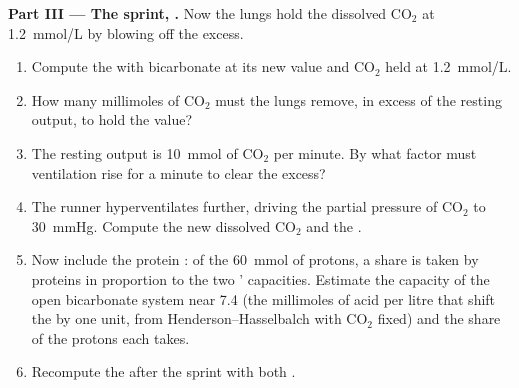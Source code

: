 \begin{problem}
\medskip
\noindent\textbf{Part III --- The sprint, .}
Now the lungs hold the dissolved $\mathrm{CO_2}$ at \qty{1.2}{mmol/L}
by blowing off the excess.
\begin{enumerate}[resume]
  \item Compute the  with bicarbonate at its new value and
        $\mathrm{CO_2}$ held at \qty{1.2}{mmol/L}.
  \item How many millimoles of $\mathrm{CO_2}$ must the lungs remove,
        in excess of the resting output, to hold the value?
  \item The resting output is \qty{10}{mmol} of $\mathrm{CO_2}$ per
        minute. By what factor must ventilation rise for a minute to
        clear the excess?
  \item The runner hyperventilates further, driving the partial
        pressure of $\mathrm{CO_2}$ to \qty{30}{mmHg}. Compute the new
        dissolved $\mathrm{CO_2}$ and the .
  \item Now include the protein : of the \qty{60}{mmol} of
        protons, a share is taken by proteins in proportion to the two
        ' capacities. Estimate the capacity of the open
        bicarbonate system near  7.4 (the millimoles of acid per
        litre that shift the  by one unit, from Henderson--Hasselbalch
        with $\mathrm{CO_2}$ fixed) and the share of the protons each
         takes.
  \item Recompute the  after the sprint with both .
\end{enumerate}


\end{problem}
